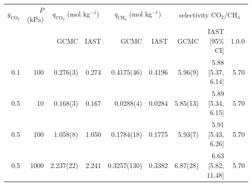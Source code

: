 \begin{tabular}{rrrrrrrrr}
\toprule
$y_{\mathrm{CO_2}}$ & $P$ (kPa) & \multicolumn{2}{c}{$q_{\mathrm{CO_2}}$ (mol kg$^{-1}$)} & \multicolumn{2}{c}{$q_{\mathrm{CH_4}}$ (mol kg$^{-1}$)} & \multicolumn{3}{c}{selectivity CO$_2$/CH$_4$} \\
\cmidrule(lr){3-4}\cmidrule(lr){5-6}\cmidrule(lr){7-9}
 & & GCMC & IAST & GCMC & IAST & GCMC & IAST [95\% CI] & 1.0.0 \\
\midrule
0.1 & 100 & 0.276(3) & 0.274 & 0.4175(46) & 0.4196 & 5.96(9) & 5.88 [5.37, 6.14] & 5.70 \\
0.5 & 10 & 0.168(3) & 0.167 & 0.0288(4) & 0.0284 & 5.85(13) & 5.89 [5.34, 6.15] & 5.70 \\
0.5 & 100 & 1.058(8) & 1.050 & 0.1784(18) & 0.1775 & 5.93(7) & 5.91 [5.43, 6.26] & 5.70 \\
0.5 & 1000 & 2.237(22) & 2.241 & 0.3257(130) & 0.3382 & 6.87(28) & 6.63 [5.82, 11.48] & 5.70 \\
\bottomrule
\end{tabular}
